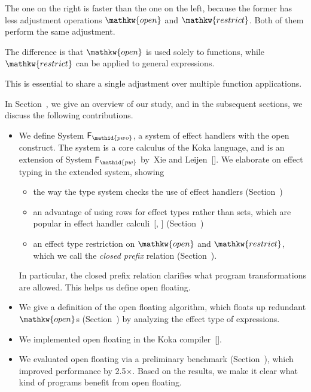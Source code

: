 \documentclass{llncs}
\begin{document}
\noindent The one on the right is faster than the one on the left, because the former has less adjustment operations $\mathpre{\mathkw{open}}$ and $\mathpre{\mathkw{restrict}}$.
Both of them perform the same adjustment.
 
The difference is that $\mathpre{\mathkw{open}}$ is used solely to functions, while $\mathpre{\mathkw{restrict}}$ can be applied to general expressions.

This is essential to share a single
adjustment over multiple function applications.%

In Section~, we give an overview of our study, and in the subsequent sections, we discuss the following contributions.%

\begin{itemize}%

\item{}
We define System $\mathpre{\mathsf{F}_{\mathid{pwo}}}$, a system of effect handlers with the open construct.
The system is a core calculus of the Koka language, and is an extension of System $\mathpre{\mathsf{F}_{\mathid{pw}}}$ by~Xie and Leijen~[].
We elaborate on effect typing in the extended system, showing%

\begin{itemize}[noitemsep,topsep=\mdcompacttopsep]%

\item the way the type system checks the use of effect handlers (Section~)%

\item an advantage of using rows for effect types rather than sets, which are popular in effect handler calculi~[, ] (Section~)%

\item an effect type restriction on $\mathpre{\mathkw{open}}$ and $\mathpre{\mathkw{restrict}}$, which we call the \emph{closed prefix} relation (Section~).%
\end{itemize}%

In particular, the closed prefix relation clarifies what program transformations are allowed. This helps us define open floating.%

\item{}
We give a definition of the open floating algorithm,
which floats up redundant $\mathpre{\mathkw{open}}$s (Section~) by analyzing the effect type of expressions.%

\item{}
We implemented open floating in the Koka compiler~[].%

\item{}
We evaluated open floating via a preliminary benchmark (Section~),
which improved performance by 2.5\ensuremath{\times}.
Based on the results, we make it clear what kind of programs benefit from open floating.%
\end{itemize}%
\end{document}
